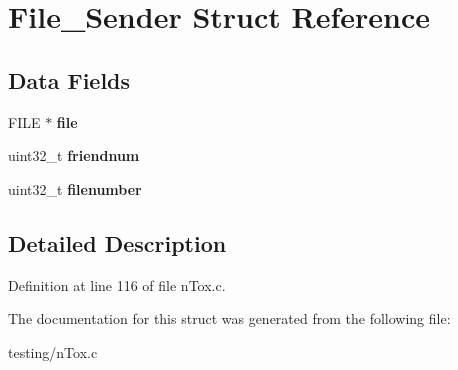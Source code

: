 \hypertarget{struct_file___sender}{\section{File\+\_\+\+Sender Struct Reference}
\label{struct_file___sender}
}
\subsection*{Data Fields}
\begin{DoxyCompactItemize}
\item 
\hypertarget{struct_file___sender_a702945180aa732857b380a007a7e2a21}{F\+I\+L\+E $\ast$ {\bfseries file}}\label{struct_file___sender_a702945180aa732857b380a007a7e2a21}

\item 
\hypertarget{struct_file___sender_af02b3246ba69ea99fddd081f6e95598f}{uint32\+\_\+t {\bfseries friendnum}}\label{struct_file___sender_af02b3246ba69ea99fddd081f6e95598f}

\item 
\hypertarget{struct_file___sender_a32e4dffe2d73a1eeddb1bc8ce5511367}{uint32\+\_\+t {\bfseries filenumber}}\label{struct_file___sender_a32e4dffe2d73a1eeddb1bc8ce5511367}

\end{DoxyCompactItemize}


\subsection{Detailed Description}


Definition at line 116 of file n\+Tox.\+c.



The documentation for this struct was generated from the following file\+:\begin{DoxyCompactItemize}
\item 
testing/n\+Tox.\+c\end{DoxyCompactItemize}
